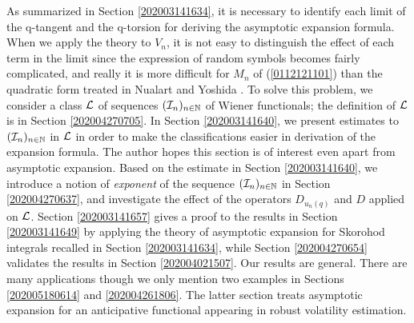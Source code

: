 \documentclass[a4paper,12pt]{article}
\numberwithin{equation}{section}
\numberwithin{equation}{section}
\newcommand{\sred}{\color[rgb]{0.8,0,0}}
\newcommand{\sred}{\color{black}}%
\begin{document}
As summarized in Section \ref{202003141634},  
it is necessary to identify each limit of the q-tangent and the q-torsion 
for deriving the asymptotic expansion formula. 
When we apply the theory to $V_n$, 
it is not easy to distinguish the effect of each term in the limit since 
the expression of random symbols becomes fairly complicated, and 
really it is more difficult 
for $M_n$ of (\ref{0112121101}) than the quadratic form treated 
in Nualart and Yoshida \cite{nualart2019asymptotic}. 
%
To solve this problem, we consider a class ${\cal L}$ of sequences $({\cal I}_n)_{n\in{\mathbb N}}$ of Wiener functionals; 
the definition of ${\cal L}$ is in Section \ref{202004270705}. 
%
In Section \ref{202003141640}, we present estimates to $({\cal I}_n)_{n\in{\mathbb N}}$ in ${\cal L}$ 
in order to make the classifications easier in derivation of the expansion formula. 
The author hopes this section is of interest even apart from asymptotic expansion. 
%
Based on the estimate in Section \ref{202003141640}, 
we introduce a notion of {\it exponent} of 
the sequence $({\cal I}_n)_{n\in{\mathbb N}}$ in Section \ref{202004270637}, and 
investigate the effect of the operators $D_{u_n(q)}$ and $D$ 
{\sred applied} on ${\cal L}$. 
%
Section \ref{202003141657} gives a proof to the results in Section \ref{202003141649} 
by applying 
the theory of asymptotic expansion for Skorohod integrals recalled in Section \ref{202003141634}, while 
Section \ref{202004270654} validates the results in Section \ref{202004021507}. 
Our results are general. There are many applications though we only mention two examples in 
Sections \ref{202005180614} and \ref{202004261806}. 
The latter section treats asymptotic expansion for an anticipative functional 
appearing in robust volatility estimation. 
\end{document}
